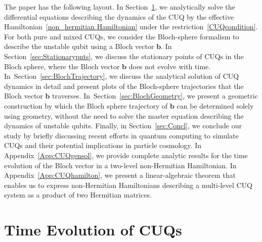 \documentclass[12pt,a4paper]{article}
\begin{document}
The paper has the following layout. In Section~\ref{sec:MixStatesolgen}, we analytically solve the differential equations describing the dynamics of the CUQ by the effective Hamiltonian~\eqref{non_hermitian Hamiltonian} under the restriction~\eqref{CUQcondition}. For both pure and mixed CUQs, we consider the Bloch-sphere formalism to describe the unstable qubit using a Bloch vector $\mathbf{b}$.  In Section~\ref{sec:Stationarypnts}, we discuss the stationary points of CUQs in the Bloch sphere, where the Bloch vector $\mathbf{b}$ does not evolve with time. In~Section~\ref{sec:BlochTrajectory}, we discuss the analytical solution of CUQ dynamics in detail and present plots of the Bloch-sphere trajectories that the Bloch vector $\mathbf{b}$ traverses. In~Section~\ref{sec:BlochGeometry}, we present a geometric construction by which  the Bloch sphere trajectory of  $\mathbf{b}$ can be determined solely using geometry, without the need to solve the master equation describing the dynamics of unstable qubits. Finally, in Section~\ref{sec:Concl}, we conclude our study by briefly discussing recent efforts in quantum computing to simulate CUQs and their potential implications in particle cosmology. In Appendix~\ref{App:CUQgensol}, we provide complete analytic results for the time evolution of the Bloch vector in a two-level non-Hermitian Hamiltonian. In Appendix~\ref{App:CUQhamilton}, we present a linear-algebraic theorem that enables us to express  non-Hermitian Hamiltonians describing a multi-level CUQ system as a product of two Hermitian matrices. 


\section{Time Evolution of CUQs}\label{sec:MixStatesolgen}
\end{document}
